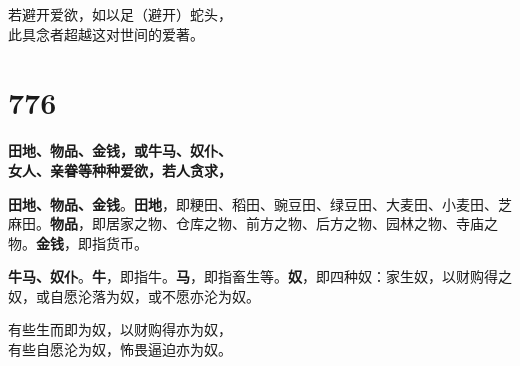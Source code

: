 \begin{quoting}若避开爱欲，如以足（避开）蛇头，\\此具念者超越这对世间的爱著。\end{quoting}


\section*{776}

\begin{quoting}\textbf{田地、物品、金钱，或牛马、奴仆、\\女人、亲眷等种种爱欲，若人贪求，}\end{quoting}


\textbf{田地、物品、金钱}。\textbf{田地}，即粳田、稻田、豌豆田、绿豆田、大麦田、小麦田、芝麻田。\textbf{物品}，即居家之物、仓库之物、前方之物、后方之物、园林之物、寺庙之物。\textbf{金钱}，即指货币。


\textbf{牛马、奴仆}。\textbf{牛}，即指牛。\textbf{马}，即指畜生等。\textbf{奴}，即四种奴：家生奴，以财购得之奴，或自愿沦落为奴，或不愿亦沦为奴。


\begin{quoting}有些生而即为奴，以财购得亦为奴，\\有些自愿沦为奴，怖畏逼迫亦为奴。\end{quoting}

